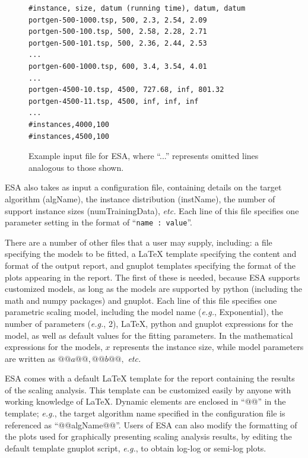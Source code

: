 \documentclass[aic]{iosart2x}
\newcommand{\eg}{\emph{e.g.}}
\begin{document}
\begin{figure}[t]
\begin{lstlisting}[basicstyle={\scriptsize\ttfamily}]
#instance, size, datum (running time), datum, datum
portgen-500-1000.tsp, 500, 2.3, 2.54, 2.09
portgen-500-100.tsp, 500, 2.58, 2.28, 2.71
portgen-500-101.tsp, 500, 2.36, 2.44, 2.53
...
portgen-600-1000.tsp, 600, 3.4, 3.54, 4.01
...
portgen-4500-10.tsp, 4500, 727.68, inf, 801.32
portgen-4500-11.tsp, 4500, inf, inf, inf
...
#instances,4000,100
#instances,4500,100
\end{lstlisting}
\vspace*{-3mm}
\caption{Example input file for ESA, where ``...'' represents omitted lines analogous to those shown.}\label{fig:Excerpt-ESA-input}
\end{figure}

ESA also takes as input a configuration file, containing details on the target algorithm (algName), the instance distribution (instName), the number of support instance sizes (numTrainingData), \emph{etc.}  
Each line of this file specifies one parameter setting in the format of  ``\lstinline[basicstyle={\ttfamily}]!name : value!''.

There are a number of other files that a user may supply, including: a file specifying the models to be fitted, a {\LaTeX} template specifying the content and format of the output report, and gnuplot templates specifying the format of the plots appearing in the report. 
The first of these is needed, because ESA supports customized models, as long as the models are supported by python (including the math and numpy packages) and gnuplot. 
Each line of this file specifies one parametric scaling model,  including the model name (\eg{}, Exponential), the number of parameters (\eg{}, 2), {\LaTeX}, python and gnuplot expressions for the model, as well as default values for the fitting parameters. 
In the mathematical expressions for the models, $x$ represents the instance size, while model parameters are written as $@@a@@, @@b@@,$ \emph{etc.}


ESA comes with a default {\LaTeX} template for the report containing the results of the scaling analysis. This template can be customized easily by anyone with working knowledge of \LaTeX. 
Dynamic elements are enclosed in ``@@'' in the template; \eg{}, the target algorithm name specified in the configuration file is referenced as ``@@algName@@''. 
Users of ESA can also modify the formatting of the plots used for graphically presenting scaling analysis results, by editing the default template gnuplot script, \eg{}, to obtain log-log or semi-log plots.
\end{document}
